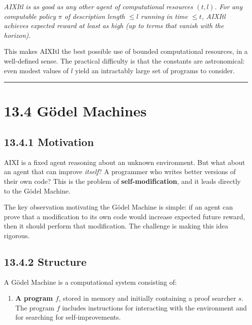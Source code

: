 \begin{theorem}
\textit{AIXItl is as good as any other agent of computational resources $(t, l)$. For any computable policy $\pi$ of description length $\leq l$ running in time $\leq t$, AIXItl achieves expected reward at least as high (up to terms that vanish with the horizon).}

This makes AIXItl the best possible use of bounded computational resources, in a well-defined sense. The practical difficulty is that the constants are astronomical: even modest values of $l$ yield an intractably large set of programs to consider.

\bigskip\hrule\bigskip
\end{theorem}

\section{13.4 Gödel Machines}

\subsection{13.4.1 Motivation}

AIXI is a fixed agent reasoning about an unknown environment. But what about an agent that can improve \textit{itself}? A programmer who writes better versions of their own code? This is the problem of \textbf{self-modification}, and it leads directly to the Gödel Machine.

The key observation motivating the Gödel Machine is simple: if an agent can prove that a modification to its own code would increase expected future reward, then it should perform that modification. The challenge is making this idea rigorous.

\subsection{13.4.2 Structure}

\begin{definition}
A Gödel Machine is a computational system consisting of:
\end{definition}

\begin{enumerate}
  \item \textbf{A program $f$}, stored in memory and initially containing a proof searcher $s$. The program $f$ includes instructions for interacting with the environment and for searching for self-improvements.
\end{enumerate}

